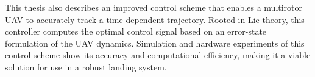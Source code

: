 This thesis also describes an improved control scheme that enables a multirotor
UAV to accurately track a time-dependent trajectory. Rooted in Lie theory, this
controller computes the optimal control signal based on an error-state
formulation of the UAV dynamics.
Simulation and hardware experiments of this control scheme show its
accuracy and computational efficiency, making it a viable solution for use in a
robust landing system.
